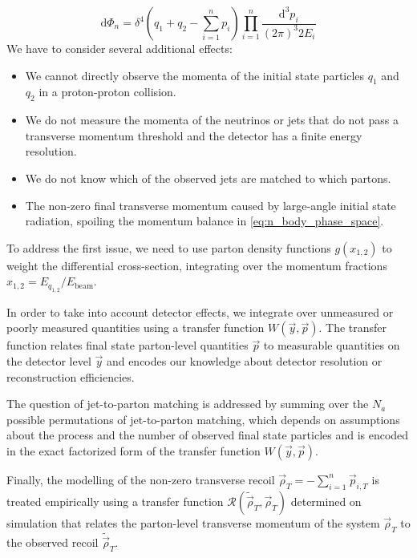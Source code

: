 \begin{equation}
\label{eq:n_body_phase_space}
\mathrm{d}\Phi_n = \delta^4 (q_1 + q_2 - \sum_{i=1}^n p_i) \prod_{i=1}^n \frac{\mathrm{d}^3 p_i}{(2\pi)^3 2 E_i}
\end{equation}
We have to consider several additional effects:
\begin{itemize}
\item We cannot directly observe the momenta of the initial state particles $q_1$ and $q_2$ in a proton-proton collision.
\item We do not measure the momenta of the neutrinos or jets that do not pass a transverse momentum threshold and the detector has a finite energy resolution.
\item We do not know which of the observed jets are matched to which partons.
\item The non-zero final transverse momentum caused by large-angle initial state radiation, spoiling the momentum balance in \cref{eq:n_body_phase_space}.
\end{itemize}

To address the first issue, we need to use parton density functions $g(x_{1,2})$ to weight the differential cross-section, integrating over the momentum fractions $x_{1,2} = E_{q_{1,2}}/E_{\mathrm{beam}}$.

In order to take into account detector effects, we integrate over unmeasured or poorly measured quantities using a transfer function $W(\vec{y}, \vec{p})$.
The transfer function relates final state parton-level quantities $\vec{p}$ to measurable quantities on the detector level $\vec{y}$ and encodes our knowledge about detector resolution or reconstruction efficiencies.

The question of jet-to-parton matching is addressed by summing over the $N_a$ possible permutations of jet-to-parton matching, which depends on assumptions about the process and the number of observed final state particles and is encoded in the exact factorized form of the transfer function $W(\vec{y}, \vec{p})$.

Finally, the modelling of the non-zero transverse recoil $\vec{\rho}_T = -\sum_{i=1}^n \vec{p}_{i,T}$ is treated empirically using a transfer function $\mathcal{R}(\tilde{\vec{\rho}}_T, \vec{\rho}_T)$ determined on simulation that relates the parton-level transverse momentum of the system $\vec{\rho}_T$ to the observed recoil $\tilde{\vec{\rho}}_T$. 


